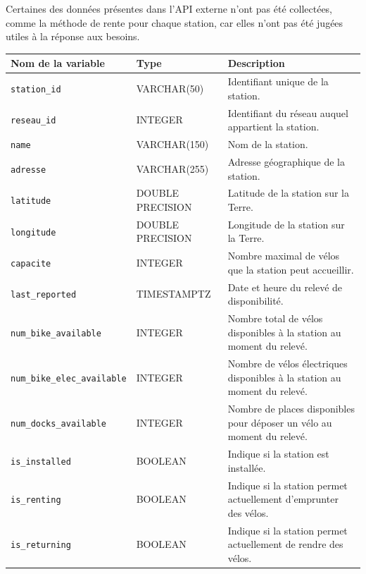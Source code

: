 \documentclass[
  french,
  11pt,
  a4paper,
]{article}
\newcounter{none} %
\begin{document}
Certaines des données présentes dans l'API externe n'ont pas été
collectées, comme la méthode de rente pour chaque station, car elles
n'ont pas été jugées utiles à la réponse aux besoins.

{\def\LTcaptype{none} %
\begin{longtable}[]{@{}
  >{\raggedright\arraybackslash}p{}
  >{\raggedright\arraybackslash}p{}
  >{\raggedright\arraybackslash}p{}@{}}
\toprule\noalign{}
\begin{minipage}[b]{\linewidth}\raggedright
Nom de la variable
\end{minipage} & \begin{minipage}[b]{\linewidth}\raggedright
Type
\end{minipage} & \begin{minipage}[b]{\linewidth}\raggedright
Description
\end{minipage} \\
\midrule\noalign{}
\endhead
\bottomrule\noalign{}
\endlastfoot
\texttt{station\_id} & VARCHAR(50) & Identifiant unique de la
station. \\
\texttt{reseau\_id} & INTEGER & Identifiant du réseau auquel appartient
la station. \\
\texttt{name} & VARCHAR(150) & Nom de la station. \\
\texttt{adresse} & VARCHAR(255) & Adresse géographique de la station. \\
\texttt{latitude} & DOUBLE PRECISION & Latitude de la station sur la
Terre. \\
\texttt{longitude} & DOUBLE PRECISION & Longitude de la station sur la
Terre. \\
\texttt{capacite} & INTEGER & Nombre maximal de vélos que la station
peut accueillir. \\
\texttt{last\_reported} & TIMESTAMPTZ & Date et heure du relevé de
disponibilité. \\
\texttt{num\_bike\_available} & INTEGER & Nombre total de vélos
disponibles à la station au moment du relevé. \\
\texttt{num\_bike\_elec\_available} & INTEGER & Nombre de vélos
électriques disponibles à la station au moment du relevé. \\
\texttt{num\_docks\_available} & INTEGER & Nombre de places disponibles
pour déposer un vélo au moment du relevé. \\
\texttt{is\_installed} & BOOLEAN & Indique si la station est
installée. \\
\texttt{is\_renting} & BOOLEAN & Indique si la station permet
actuellement d'emprunter des vélos. \\
\texttt{is\_returning} & BOOLEAN & Indique si la station permet
actuellement de rendre des vélos. \\
\end{longtable}
}
\end{document}
